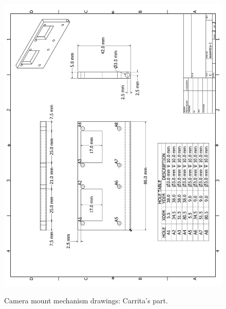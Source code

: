 \begin{figure}[ht!]
\begin{center}
\includegraphics[height=1.2\textwidth]{fig/cammountp3}\\
\caption[Drawing. Carrita's part.]{Camera mount mechanism drawings: Carrita's part.}
\label{fig_cammountp3}
\end{center}
\end{figure}
